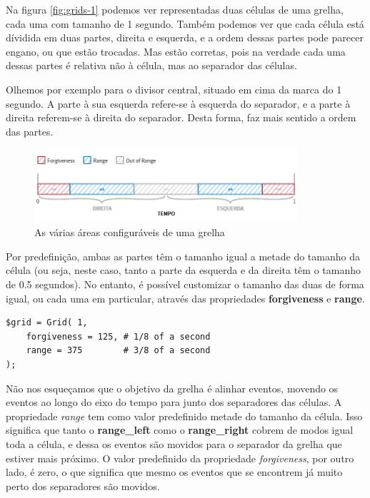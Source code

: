 Na figura \ref{fig:grids-1} podemos ver representadas duas células de uma grelha, cada uma com tamanho de 1 segundo. Também podemos ver que cada célula está dívidida em duas partes, direita e esquerda, e a ordem dessas partes pode parecer engano, ou que estão trocadas. Mas estão corretas, pois na verdade cada uma dessas partes é relativa não à célula, mas ao separador das células.

Olhemos por exemplo para o divisor central, situado em cima da marca do 1 segundo. A parte à sua esquerda refere-se à esquerda do separador, e a parte à direita referem-se à direita do separador. Desta forma, faz mais sentido a ordem das partes.

\begin{figure}[h]
\begin{center}
    \includegraphics[width=0.87\textwidth]{img/grids_2.png}
\end{center}
\caption{As várias áreas configuráveis de uma grelha}
\label{fig:grids-2}
\end{figure}

Por predefinição, ambas as partes têm o tamanho igual a metade do tamanho da célula (ou seja, neste caso, tanto a parte da esquerda e da direita têm o tamanho de 0.5 segundos). No entanto, é possível customizar o tamanho das duas de forma igual, ou cada uma em particular, através das propriedades \textbf{forgiveness} e \textbf{range}.

\begin{lstlisting}[caption={Código de definição da grelha representada na figura \ref{fig:grids-2}},label={lst:grids-2}]
$grid = Grid( 1,
    forgiveness = 125, # 1/8 of a second
    range = 375        # 3/8 of a second
);
\end{lstlisting}

Não nos esqueçamos que o objetivo da grelha é alinhar eventos, movendo os eventos ao longo do eixo do tempo para junto dos separadores das células. A propriedade \textit{range} tem como valor predefinido metade do tamanho da célula. Isso significa que tanto o \textbf{range\_left} como o \textbf{range\_right} cobrem de modos igual toda a célula, e dessa os eventos são movidos para o separador da grelha que estiver mais próximo. O valor predefinido da propriedade \textit{forgiveness}, por outro lado, é zero, o que significa que mesmo os eventos que se encontrem já muito perto dos separadores são movidos.


